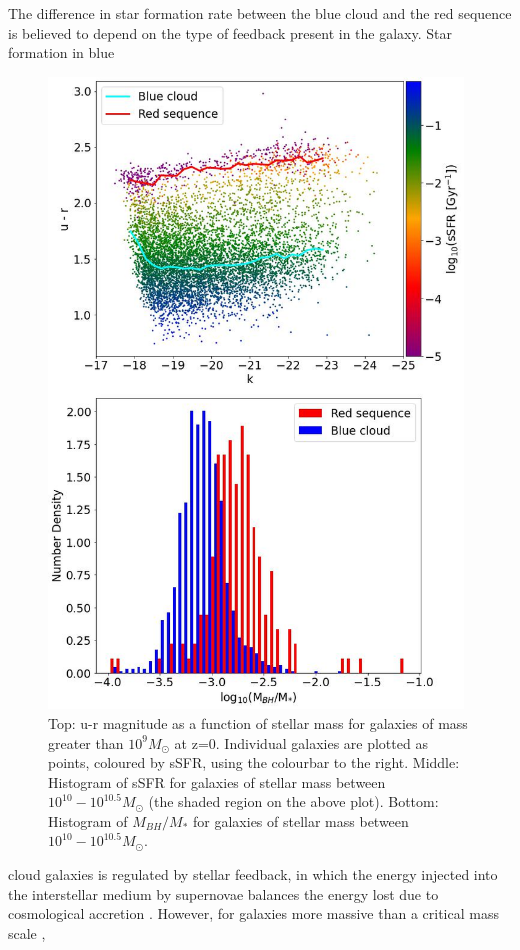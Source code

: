 \documentclass[12pt, twocolumn]{revtex4}    %
\begin{document}
The difference in star formation rate between the blue cloud and the red sequence is believed to depend on the type of feedback present in the galaxy. Star formation in blue

\onecolumngrid


\begin{figure}[H]
\centering
\includegraphics[width=11cm]{Plot_1.jpeg}
\caption{Top: u-r magnitude as a function of stellar mass for galaxies of mass greater than $10^9M_\odot$ at z=0. Individual galaxies are plotted as points, coloured by sSFR, using the colourbar to the right. Middle: Histogram of sSFR for galaxies of stellar mass between $10^{10} - 10^{10.5}M_\odot$ (the shaded region on the above plot). Bottom: Histogram of $M_{BH}/M_*$ for galaxies of stellar mass between $10^{10} - 10^{10.5}M_\odot$.}
\label{fig:1}
\end{figure}
\twocolumngrid


\noindent cloud galaxies is regulated by  stellar feedback, in which the energy injected into the interstellar medium by supernovae balances the energy lost due to cosmological accretion \cite{Ikea}. However, for galaxies more massive than a critical mass scale \cite{Quasar},
\end{document}
